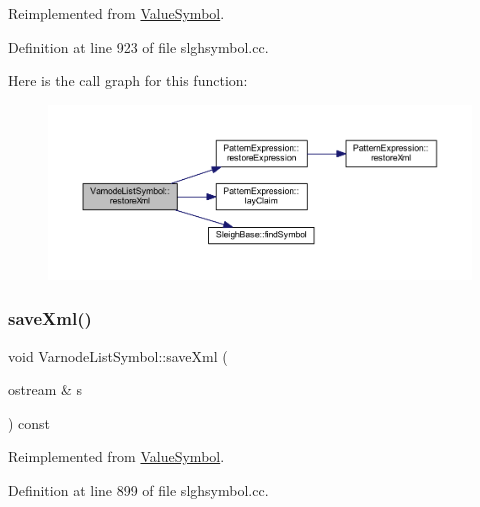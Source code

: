 Reimplemented from \mbox{\hyperlink{class_value_symbol_af9104983ea7381b608fe56b5ab8a2d7c}{Value\+Symbol}}.



Definition at line 923 of file slghsymbol.\+cc.

Here is the call graph for this function\+:
\nopagebreak
\begin{figure}[H]
\begin{center}
\leavevmode
\includegraphics[width=350pt]{class_varnode_list_symbol_a61923762838951414bd2c84454652d44_cgraph}
\end{center}
\end{figure}
\mbox{\label{class_varnode_list_symbol_a4b95e5f5b2c0ebd4a0eee076c9ed96de}} 
\subsubsection{\texorpdfstring{saveXml()}{saveXml()}}
{\footnotesize\ttfamily void Varnode\+List\+Symbol\+::save\+Xml (\begin{DoxyParamCaption}\item[{ostream \&}]{s }\end{DoxyParamCaption}) const\hspace{0.3cm}{\ttfamily [virtual]}}



Reimplemented from \mbox{\hyperlink{class_value_symbol_aa7b4012d522c5864aea52486b0d47978}{Value\+Symbol}}.



Definition at line 899 of file slghsymbol.\+cc.

